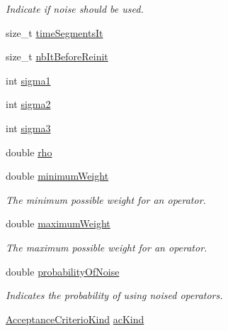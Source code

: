 \begin{DoxyCompactItemize}
\begin{DoxyCompactList}\small\item\em Indicate if noise should be used. \end{DoxyCompactList}\item 
size\-\_\-t \hyperlink{classALNS__Parameters_a748ba0be25197278911459d8777d4137}{time\-Segments\-It}
\item 
size\-\_\-t \hyperlink{classALNS__Parameters_a71f14dea13400809264b6d80601e0bdd}{nb\-It\-Before\-Reinit}
\item 
int \hyperlink{classALNS__Parameters_a71cea2ded56ca74871a5d434e03b30f4}{sigma1}
\item 
int \hyperlink{classALNS__Parameters_a9ea8c0def481bbe0c2badb491ddb6149}{sigma2}
\item 
int \hyperlink{classALNS__Parameters_ad4e91eb974a8343a9cf968d44b38abcd}{sigma3}
\item 
double \hyperlink{classALNS__Parameters_a4bf8967ee96b03fe872daf5da1a23782}{rho}
\item 
\hypertarget{classALNS__Parameters_a43836684feb26f2dd6d44f57bc4d8c52}{double \hyperlink{classALNS__Parameters_a43836684feb26f2dd6d44f57bc4d8c52}{minimum\-Weight}}\label{classALNS__Parameters_a43836684feb26f2dd6d44f57bc4d8c52}

\begin{DoxyCompactList}\small\item\em The minimum possible weight for an operator. \end{DoxyCompactList}\item 
\hypertarget{classALNS__Parameters_a907c74cf4c039aafd45af1be5c564f84}{double \hyperlink{classALNS__Parameters_a907c74cf4c039aafd45af1be5c564f84}{maximum\-Weight}}\label{classALNS__Parameters_a907c74cf4c039aafd45af1be5c564f84}

\begin{DoxyCompactList}\small\item\em The maximum possible weight for an operator. \end{DoxyCompactList}\item 
\hypertarget{classALNS__Parameters_ade0d6fac20ee1d90c5a5a4e0f2f3ac5a}{double \hyperlink{classALNS__Parameters_ade0d6fac20ee1d90c5a5a4e0f2f3ac5a}{probability\-Of\-Noise}}\label{classALNS__Parameters_ade0d6fac20ee1d90c5a5a4e0f2f3ac5a}

\begin{DoxyCompactList}\small\item\em Indicates the probability of using noised operators. \end{DoxyCompactList}\item 
\hypertarget{classALNS__Parameters_ac87749e7f117607ca350422f6053303f}{\hyperlink{classALNS__Parameters_addd5421947a7a1a533fec576f37560c7}{Acceptance\-Criterio\-Kind} \hyperlink{classALNS__Parameters_ac87749e7f117607ca350422f6053303f}{ac\-Kind}}\label{classALNS__Parameters_ac87749e7f117607ca350422f6053303f}


\end{DoxyCompactItemize}
